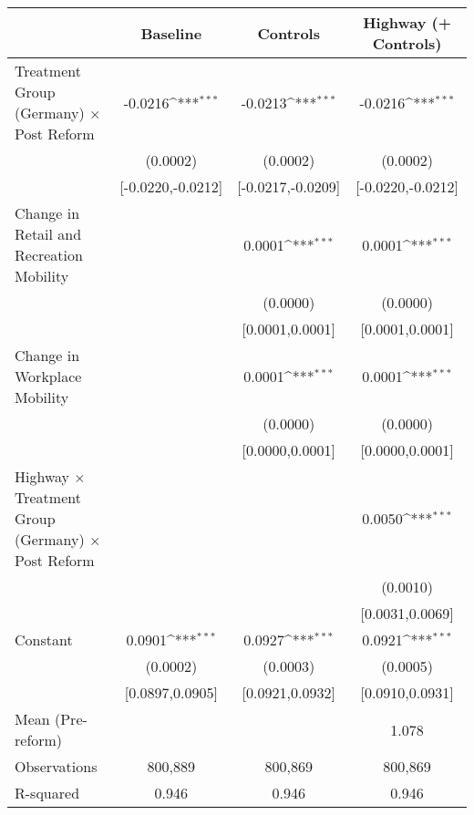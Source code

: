 {
\def\sym#1{\ifmmode^{#1}\else\(^{#1}\)\fi}
\begin{tabular}{l*{3}{c}}
\toprule
                    &\multicolumn{1}{c}{Baseline}&\multicolumn{1}{c}{Controls}&\multicolumn{1}{c}{Highway (+ Controls)}\\
\midrule
Treatment Group (Germany) $\times$ Post Reform&     -0.0216\sym{***}&     -0.0213\sym{***}&     -0.0216\sym{***}\\
                    &    (0.0002)         &    (0.0002)         &    (0.0002)         \\
                    &[-0.0220,-0.0212]         &[-0.0217,-0.0209]         &[-0.0220,-0.0212]         \\
Change in Retail and Recreation Mobility&                     &      0.0001\sym{***}&      0.0001\sym{***}\\
                    &                     &    (0.0000)         &    (0.0000)         \\
                    &                     &[0.0001,0.0001]         &[0.0001,0.0001]         \\
Change in Workplace Mobility&                     &      0.0001\sym{***}&      0.0001\sym{***}\\
                    &                     &    (0.0000)         &    (0.0000)         \\
                    &                     &[0.0000,0.0001]         &[0.0000,0.0001]         \\
Highway $\times$ Treatment Group (Germany) $\times$ Post Reform&                     &                     &      0.0050\sym{***}\\
                    &                     &                     &    (0.0010)         \\
                    &                     &                     &[0.0031,0.0069]         \\
Constant            &      0.0901\sym{***}&      0.0927\sym{***}&      0.0921\sym{***}\\
                    &    (0.0002)         &    (0.0003)         &    (0.0005)         \\
                    &[0.0897,0.0905]         &[0.0921,0.0932]         &[0.0910,0.0931]         \\
\midrule
Mean (Pre-reform)   &                     &                     &       1.078         \\
Observations        &     800,889         &     800,869         &     800,869         \\
R-squared           &       0.946         &       0.946         &       0.946         \\
\bottomrule
\end{tabular}
}
